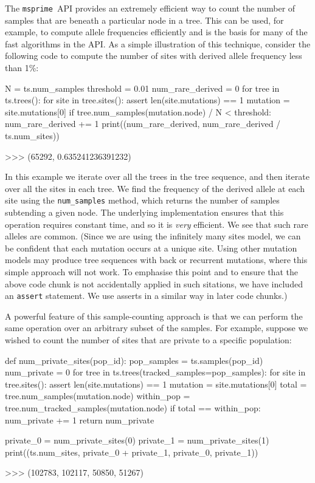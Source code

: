 \documentclass[graybox]{svmult}
\newcommand{\msprime}[0]{\texttt{msprime}}
\begin{document}
The \msprime\ API provides an extremely efficient way to count the number of samples that are beneath a particular node in a tree. This can be used,
for example, to compute allele frequencies efficiently and is the basis
for many of the fast algorithms in the API. As a simple illustration of
this technique, consider the following code to compute the number of
sites with derived allele frequency less than 1\%:

\begin{pythoncode}
N = ts.num_samples
threshold = 0.01
num_rare_derived = 0
for tree in ts.trees():
    for site in tree.sites():
        assert len(site.mutations) == 1
        mutation = site.mutations[0]
        if tree.num_samples(mutation.node) / N < threshold:
            num_rare_derived += 1
print((num_rare_derived, num_rare_derived / ts.num_sites))

>>> (65292, 0.635241236391232)
\end{pythoncode}

    In this example we iterate over all the trees in the tree sequence, and
then iterate over all the sites in each tree. We find the frequency
of the derived allele at each site using the \texttt{num\_samples}
method, which returns the number of samples subtending a given
node. The underlying implementation ensures that this operation requires
constant time, and so it is \emph{very} efficient. We see that such rare alleles are common.
(Since we are using the infinitely many sites model, we can be confident that
each mutation occurs at a unique site. Using other mutation models may produce
tree sequences with back or recurrent mutations, where this simple approach
will not work. To emphasise this point and to ensure that
the above code chunk is not accidentally applied in such sitations, we have included an
\texttt{assert} statement. We use asserts in a similar way in later code chunks.)

A powerful feature of this sample-counting approach is that we can
perform the same operation over an arbitrary subset of the samples. For
example, suppose we wished to count the number of sites that are private
to a specific population:

\begin{pythoncode}
def num_private_sites(pop_id):
    pop_samples = ts.samples(pop_id)
    num_private = 0
    for tree in ts.trees(tracked_samples=pop_samples):
        for site in tree.sites():
            assert len(site.mutations) == 1
            mutation = site.mutations[0]
            total = tree.num_samples(mutation.node)
            within_pop = tree.num_tracked_samples(mutation.node)
            if total == within_pop:
                num_private += 1
    return num_private

private_0 = num_private_sites(0)
private_1 = num_private_sites(1)
print((ts.num_sites, private_0 + private_1, private_0, private_1))

>>> (102783, 102117, 50850, 51267)
\end{pythoncode}
\end{document}
